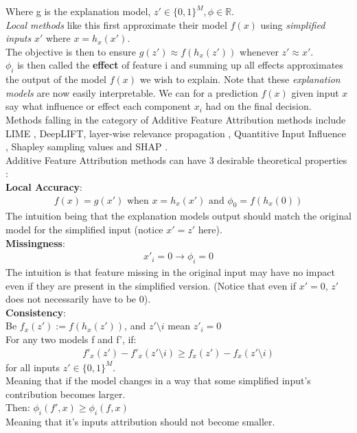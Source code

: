 \documentclass[conference]{IEEEtran}
\begin{document}
Where g is the explanation model, $z' \in \{0,1\}^M, \phi \in \mathbb{R}$. \\
\textit{Local methods} like this first approximate their model $f(x)$ using \textit{simplified inputs} $x'$ where $x = h_x(x')$.\\
The objective is then to ensure $g(z') \approx f(h_x(z'))$ whenever $z' \approx x'$. \\
$\phi_i$ is then called the \textbf{effect} of feature i and summing up all effects approximates the output of the model $f(x)$ we wish to explain. Note that these \textit{explanation models} are now easily interpretable. We can for a prediction $f(x)$ given input $x$  say what influence or effect each component $x_i$ had on the final decision.\\
Methods falling in the category of Additive Feature Attribution methods include LIME \cite{b4}, DeepLIFT\cite{b5}, layer-wise relevance propagation \cite{b6}, Quantitive Input Influence \cite{b7}, Shapley sampling values \cite{b8} and SHAP \cite{b2}.\\

Additive Feature Attribution methods can have 3 desirable theoretical properties \cite{b2}:\\

\textbf{Local Accuracy}: \\
\begin{align}
f(x) = g(x') \text{ when } x = h_x(x') \text{ and } \phi_0 = f(h_x(0))
\end{align}
The intuition being that the explanation models output should match the original model for the simplified input (notice $x' = z'$ here). \\

\textbf{Missingness}: \\
\begin{align}
x'_i = 0 \rightarrow \phi_i = 0
\end{align}
The intuition is that feature missing in the original input may have no impact even if they are present in the simplified version. (Notice that even if $x' = 0$, $z'$ does not necessarily have to be 0).\\

\textbf{Consistency}: \\
Be $f_x(z') := f(h_x(z'))$, and $z' \setminus i$ mean $z'_i = 0$\\
For any two models f and f', if:
\begin{align}
f'_x(z') - f'_x(z' \setminus i) \geq f_x(z') - f_x(z' \setminus i)
\end{align}
for all inputs $z' \in \{0,1\}^M$. \\
Meaning that if the model changes in a way that some simplified input's contribution becomes larger.\\
Then: $ \phi_i(f', x) \geq \phi_i(f,x)$ \\
Meaning that it's inputs attribution should not become smaller.\\
\end{document}
